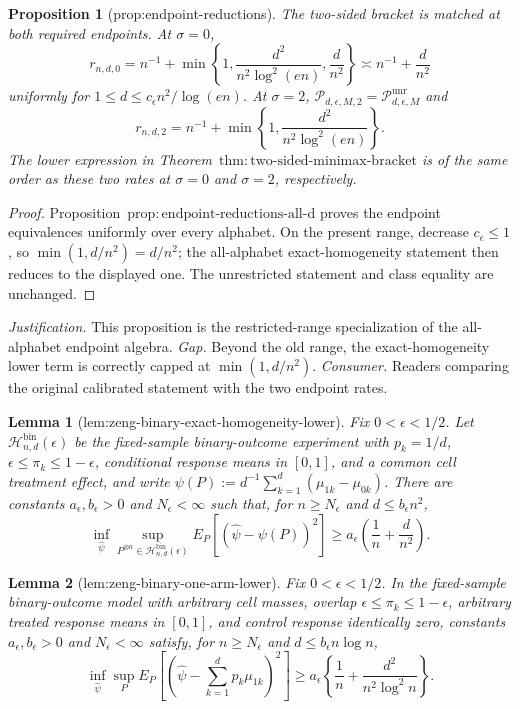 \documentclass{article}
\newtheorem{lemma}{Lemma}
\newtheorem{proposition}{Proposition}
\begin{document}
\begin{proposition}[prop:endpoint-reductions]\label{prop:endpoint-reductions}
The two-sided bracket is matched at both required endpoints.  At \(\sigma=0\),
\[
 r_{n,d,0}=n^{-1}+\min\left\{1,\frac{d^2}{n^2\log^2(en)},\frac d{n^2}\right\}
 \asymp n^{-1}+\frac d{n^2}
\]
uniformly for \(1\le d\le c_{\epsilon}n^2/\log(en)\).  At \(\sigma=2\),
\(\mathcal P_{d,\epsilon,M,2}=\mathcal P_{d,\epsilon,M}^{\mathrm{unr}}\) and
\[
 r_{n,d,2}=n^{-1}+\min\left\{1,\frac{d^2}{n^2\log^2(en)}\right\}.
\]
The lower expression in Theorem~\(\mathrm{thm:two\text{-}sided\text{-}minimax\text{-}bracket}\) is of the same order as these two rates at \(\sigma=0\) and \(\sigma=2\), respectively.
\end{proposition}
\begin{proof}
Proposition~\(\mathrm{prop:endpoint\text{-}reductions\text{-}all\text{-}d}\) proves the endpoint equivalences uniformly over every alphabet.  On the present range, decrease \(c_{\epsilon}\le1\), so \(\min(1,d/n^2)=d/n^2\); the all-alphabet exact-homogeneity statement then reduces to the displayed one.  The unrestricted statement and class equality are unchanged.
\end{proof}
\par\smallskip\noindent \textit{Justification.} This proposition is the restricted-range specialization of the all-alphabet endpoint algebra. \textit{Gap.} Beyond the old range, the exact-homogeneity lower term is correctly capped at \(\min(1,d/n^2)\). \textit{Consumer.} Readers comparing the original calibrated statement with the two endpoint rates.

\begin{lemma}[lem:zeng-binary-exact-homogeneity-lower]\label{lem:zeng-binary-exact-homogeneity-lower}
Fix \(0<\epsilon<1/2\).  Let \(\mathcal H_{n,d}^{\mathrm{bin}}(\epsilon)\) be the fixed-sample binary-outcome experiment with \(p_k=1/d\), \(\epsilon\le\pi_k\le1-\epsilon\), conditional response means in \([0,1]\), and a common cell treatment effect, and write \(\psi(P):=d^{-1}\sum_{k=1}^d(\mu_{1k}-\mu_{0k})\).  There are constants \(a_{\epsilon},b_{\epsilon}>0\) and \(N_{\epsilon}<\infty\) such that, for \(n\ge N_{\epsilon}\) and \(d\le b_{\epsilon}n^2\),
\[
 \inf_{\widehat\psi}\sup_{P^{\otimes n}\in\mathcal H_{n,d}^{\mathrm{bin}}(\epsilon)}
 E_P[(\widehat\psi-\psi(P))^2]
 \ge a_{\epsilon}\left(\frac1n+\frac d{n^2}\right).
\]
\end{lemma}

\begin{lemma}[lem:zeng-binary-one-arm-lower]\label{lem:zeng-binary-one-arm-lower}
Fix \(0<\epsilon<1/2\).  In the fixed-sample binary-outcome model with arbitrary cell masses, overlap \(\epsilon\le\pi_k\le1-\epsilon\), arbitrary treated response means in \([0,1]\), and control response identically zero, constants \(a_{\epsilon},b_{\epsilon}>0\) and \(N_{\epsilon}<\infty\) satisfy, for \(n\ge N_{\epsilon}\) and \(d\le b_{\epsilon}n\log n\),
\[
 \inf_{\widehat\psi}\sup_P E_P[(\widehat\psi-\sum_{k=1}^dp_k\mu_{1k})^2]
 \ge a_{\epsilon}\left\{\frac1n+\frac{d^2}{n^2\log^2 n}\right\}.
\]
\end{lemma}
\end{document}
